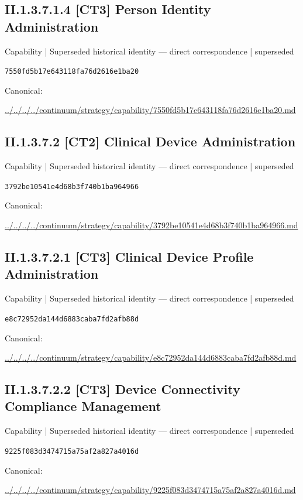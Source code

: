 \documentclass[10pt,a4paper]{article}
\begin{document}
\subsection*{II.1.3.7.1.4 [CT3] Person Identity Administration}
{\small Capability | Superseded historical identity — direct correspondence | superseded}\par
\texttt{7550fd5b17e643118fa76d2616e1ba20}\par
Canonical: \par
{\footnotesize\url{../../../../continuum/strategy/capability/7550fd5b17e643118fa76d2616e1ba20.md}}\par
\subsection*{II.1.3.7.2 [CT2] Clinical Device Administration}
{\small Capability | Superseded historical identity — direct correspondence | superseded}\par
\texttt{3792be10541e4d68b3f740b1ba964966}\par
Canonical: \par
{\footnotesize\url{../../../../continuum/strategy/capability/3792be10541e4d68b3f740b1ba964966.md}}\par
\subsection*{II.1.3.7.2.1 [CT3] Clinical Device Profile Administration}
{\small Capability | Superseded historical identity — direct correspondence | superseded}\par
\texttt{e8c72952da144d6883caba7fd2afb88d}\par
Canonical: \par
{\footnotesize\url{../../../../continuum/strategy/capability/e8c72952da144d6883caba7fd2afb88d.md}}\par
\subsection*{II.1.3.7.2.2 [CT3] Device Connectivity Compliance Management}
{\small Capability | Superseded historical identity — direct correspondence | superseded}\par
\texttt{9225f083d3474715a75af2a827a4016d}\par
Canonical: \par
{\footnotesize\url{../../../../continuum/strategy/capability/9225f083d3474715a75af2a827a4016d.md}}\par
\end{document}
